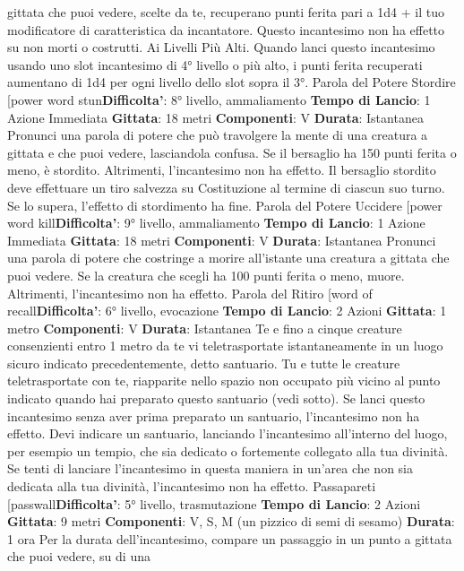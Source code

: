 \begin{multicols}{2}
gittata che puoi vedere, scelte da te, recuperano punti
ferita pari a 1d4 + il tuo modificatore di caratteristica da
incantatore. Questo incantesimo non ha effetto su non
morti o costrutti.
Ai Livelli Più Alti. Quando lanci questo incantesimo
usando uno slot incantesimo di 4° livello o più alto, i
punti ferita recuperati aumentano di 1d4 per ogni livello
dello slot sopra il 3°.
Parola del Potere Stordire
[power word stun\textbf{Difficolta'}:
8° livello, ammaliamento
\textbf{Tempo di Lancio}: 1 Azione Immediata
\textbf{Gittata}: 18 metri
\textbf{Componenti}: V
\textbf{Durata}: Istantanea
Pronunci una parola di potere che può travolgere la
mente di una creatura a gittata e che puoi vedere,
lasciandola confusa. Se il bersaglio ha 150 punti ferita o
meno, è stordito. Altrimenti, l’incantesimo non ha
effetto.
Il bersaglio stordito deve effettuare un tiro salvezza su
Costituzione al termine di ciascun suo turno. Se lo
supera, l’effetto di stordimento ha fine.
Parola del Potere Uccidere
[power word kill\textbf{Difficolta'}:
9° livello, ammaliamento
\textbf{Tempo di Lancio}: 1 Azione Immediata
\textbf{Gittata}: 18 metri
\textbf{Componenti}: V
\textbf{Durata}: Istantanea
Pronunci una parola di potere che costringe a morire
all’istante una creatura a gittata che puoi vedere. Se la
creatura che scegli ha 100 punti ferita o meno, muore.
Altrimenti, l’incantesimo non ha effetto.
Parola del Ritiro
[word of recall\textbf{Difficolta'}:
6° livello, evocazione
\textbf{Tempo di Lancio}: 2 Azioni
\textbf{Gittata}: 1 metro
\textbf{Componenti}: V
\textbf{Durata}: Istantanea
Te e fino a cinque creature consenzienti entro 1 metro
da te vi teletrasportate istantaneamente in un luogo
sicuro indicato precedentemente, detto santuario. Tu e
tutte le creature teletrasportate con te, riapparite nello
spazio non occupato più vicino al punto indicato quando
hai preparato questo santuario (vedi sotto). Se lanci
questo incantesimo senza aver prima preparato un
santuario, l’incantesimo non ha effetto.
Devi indicare un santuario, lanciando l’incantesimo
all’interno del luogo, per esempio un tempio, che sia
dedicato o fortemente collegato alla tua divinità. Se tenti
di lanciare l’incantesimo in questa maniera in un’area
che non sia dedicata alla tua divinità, l’incantesimo non
ha effetto.
Passapareti
[passwall\textbf{Difficolta'}:
5° livello, trasmutazione
\textbf{Tempo di Lancio}: 2 Azioni
\textbf{Gittata}: 9 metri
\textbf{Componenti}: V, S, M (un pizzico di semi di sesamo)
\textbf{Durata}: 1 ora
Per la durata dell’incantesimo, compare un passaggio
in un punto a gittata che puoi vedere, su di una

\end{multicols}
